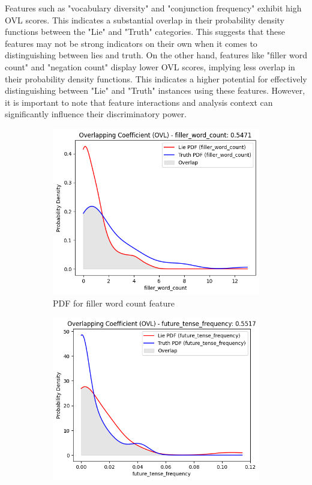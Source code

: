 \documentclass[12pt]{article}
\begin{document}
Features such as "vocabulary diversity" and "conjunction frequency" exhibit high OVL scores. This indicates a substantial overlap in their probability density functions between the "Lie" and "Truth" categories. This suggests that these features may not be strong indicators on their own when it comes to distinguishing between lies and truth. On the other hand, features like "filler word count" and "negation count" display lower OVL scores, implying less overlap in their probability density functions. This indicates a higher potential for effectively distinguishing between "Lie" and "Truth" instances using these features. However, it is important to note that feature interactions and analysis context can significantly influence their discriminatory power.
\begin{figure}[H]
    \begin{subfigure}{0.5\textwidth} %
        \includegraphics[width=\textwidth]{Figures/filler_word_count.png}
        \caption{PDF for filler word count feature}
        \label{fig:1}
    \end{subfigure}%
    \begin{subfigure}{0.5\textwidth} %
        \includegraphics[width=\textwidth]{Figures/future_tense_frequency.png}

\end{subfigure}
\end{figure}
\end{document}
